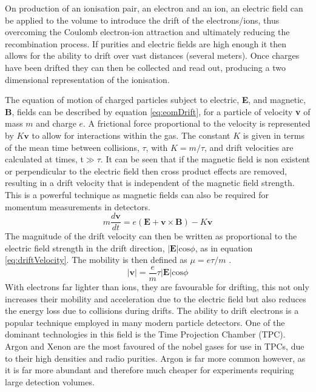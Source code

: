 On production of an ionisation pair, an electron and an ion, an electric field can be applied to the volume to introduce the drift of the electrons/ions, thus overcoming the Coulomb electron-ion attraction and ultimately reducing the recombination process. If purities and electric fields are high enough it then allows for the ability to drift over vast distances (several meters). Once charges have been drifted they can then be collected and read out, producing a two dimensional representation of the ionisation. 

The equation of motion of charged particles subject to electric, \textbf{E}, and magnetic, \textbf{B}, fields can be described by equation \ref{eq:eomDrift}, for a particle of velocity \textbf{v} of mass $m$ and charge $e$. A frictional force proportional to the velocity is represented by $K\textbf{v}$ to allow for interactions within the gas. The constant $K$ is given in terms of the mean time between collisions, $\tau$, with $K=m/\tau$, and drift velocities are calculated at times, t$\gg\tau$. It can be seen that if the magnetic field is non existent or perpendicular to the electric field then cross product effects are removed, resulting in a drift velocity that is independent of the magnetic field strength. This is a powerful technique as magnetic fields can also be required for momentum measurements in detectors.
\begin{equation}
	m\frac{d\textbf{v}}{dt} = e(\textbf{E} + \textbf{v} \times \textbf{B}) - K\textbf{v}
	\label{eq:eomDrift}
\end{equation}
The magnitude of the drift velocity can then be written as proportional to the electric field strength in the drift direction, $|\textbf{E}|\text{cos}{\phi}$, as in equation \ref{eq:driftVelocity}. The mobility is then defined as $\mu = e\tau/m$ \cite{driftDetectorsBook}.
\begin{equation}
	|\textbf{v}| = \frac{e}{m}\tau|\textbf{E}|\text{cos}{\phi}
	\label{eq:driftVelocity}
\end{equation}
With electrons far lighter than ions, they are favourable for drifting, this not only increases their mobility and acceleration due to the electric field but also reduces the energy loss due to collisions during drifts. The ability to drift electrons is a popular technique employed in many modern particle detectors. One of the dominant technologies in this field is the Time Projection Chamber (TPC). Argon and Xenon are the most favoured of the nobel gases for use in TPCs, due to their high densities and radio purities. Argon is far more common however, as it is far more abundant and therefore much cheaper for experiments requiring large detection volumes.

